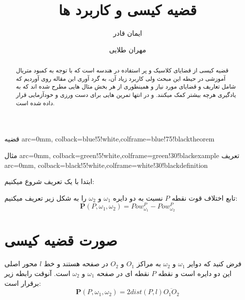 \documentclass{article}
\author{ایمان قادر \and  مهران طلایی }
\title{قضیه کیسی و کاربرد ها}
\begin{document}
\maketitle

\begin{abstract}
قضیه کیسی از قضایای کلاسیک و پر استفاده در هندسه است که با توجه به کمبود متریال آموزشی در حیطه این مبحث ولی کاربرد زیاد آن، به گرد آوری این مقاله روی آوردیم که شامل تعاریف و قضایای مورد نیاز و همینطوری از هر بخش مثال هایی مطرح شده اند که به یادگیری هرچه بیشتر کمک میکنند. و در انتها تمرین هایی برای دست ورزی و خودآزمایی قرار داده شده است.
\end{abstract}

%
  {قضیه}{
     arc=0mm, colback=blue!5!white,colframe=blue!75!black}{theorem}
  
  
%
  {مثال}{
     arc=0mm, colback=green!5!white,colframe=green!30!black}{example}
%
  {تعریف }{
     arc=0mm, colback=black!5!white,colframe=white!30!black}{definition}
     
ابتدا با یک تعریف شروع میکنیم:
\begin{defi}{}{}
تابع اختلاف قوت نقطه $P$ نسبت به دو دایره $\omega_1$ و $\omega_2$ را به شکل زیر تعریف میکنیم:
\[\mathbf{P}(P,\omega_1,\omega_2)=Pow_{\omega_1}^P -Pow_{\omega_2}^P\]
\end{defi}

\section{صورت قضیه کیسی}

\begin{theo}{}{}
فرض کنید که دوایر $\omega_1$ و $\omega_2$ به مراکز $O_1$ و $O_2$ در صفحه هستند و خط $l$ محور اصلی این دو دایره است و نقطه $P$ نقطه ای در صفحه $\omega_1$ و $\omega_2$ است. آنوقت رابطه زیر برقرار است:
\[\mathbf{P}(P,\omega_1,\omega_2)=2dist(P,l) \overline{O_1O_2} \]
\end{theo}
\end{document}
